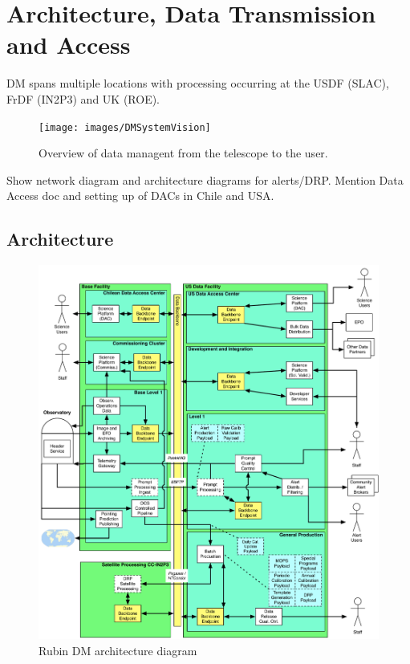 \section {Architecture, Data Transmission and  Access } \label{sec:arch}
DM spans multiple locations with processing occurring at the USDF (SLAC), FrDF (IN2P3) and UK (ROE).
\begin{figure}
\begin{centering}
\texttt{[image: images/DMSystemVision]}
	\caption{Overview of data managent from the telescope to the user. \label{fig:vision}}
\end{centering}
\end{figure}

Show network diagram and architecture diagrams for alerts/DRP. Mention Data Access doc  \cite{RDO-013} and
setting up of DACs in Chile and USA.

\subsection{Architecture}

\begin{figure}
\begin{centering}
\includegraphics[width=1.0\textwidth]{images/DMS_Architecture}
	\caption{Rubin DM architecture diagram \cite{LDM-148}\label{fig:arch}}
\end{centering}
\end{figure}

